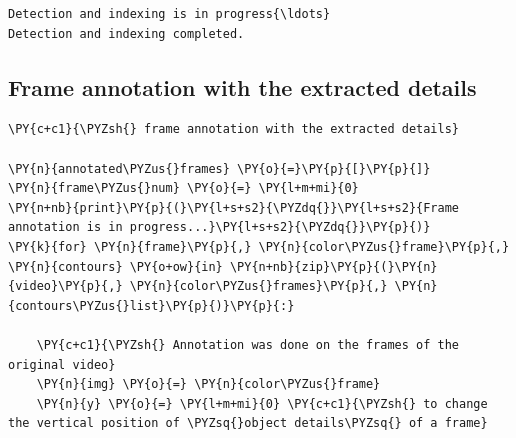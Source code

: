 \documentclass[a4paper,11pt]{article}%
\begin{document}
    \begin{Verbatim}[commandchars=\\\{\}]
Detection and indexing is in progress{\ldots}
Detection and indexing completed.
    \end{Verbatim}
\subsection{Frame annotation with the extracted details}
    \begin{tcolorbox}[breakable, size=fbox, boxrule=1pt, pad at break*=1mm,colback=cellbackground, colframe=cellborder]
\begin{Verbatim}[commandchars=\\\{\}]
\PY{c+c1}{\PYZsh{} frame annotation with the extracted details}

\PY{n}{annotated\PYZus{}frames} \PY{o}{=}\PY{p}{[}\PY{p}{]}
\PY{n}{frame\PYZus{}num} \PY{o}{=} \PY{l+m+mi}{0}
\PY{n+nb}{print}\PY{p}{(}\PY{l+s+s2}{\PYZdq{}}\PY{l+s+s2}{Frame annotation is in progress...}\PY{l+s+s2}{\PYZdq{}}\PY{p}{)}
\PY{k}{for} \PY{n}{frame}\PY{p}{,} \PY{n}{color\PYZus{}frame}\PY{p}{,} \PY{n}{contours} \PY{o+ow}{in} \PY{n+nb}{zip}\PY{p}{(}\PY{n}{video}\PY{p}{,} \PY{n}{color\PYZus{}frames}\PY{p}{,} \PY{n}{contours\PYZus{}list}\PY{p}{)}\PY{p}{:}

    \PY{c+c1}{\PYZsh{} Annotation was done on the frames of the original video}
    \PY{n}{img} \PY{o}{=} \PY{n}{color\PYZus{}frame}
    \PY{n}{y} \PY{o}{=} \PY{l+m+mi}{0} \PY{c+c1}{\PYZsh{} to change the vertical position of \PYZsq{}object details\PYZsq{} of a frame}


\end{Verbatim}
\end{tcolorbox}
\end{document}
